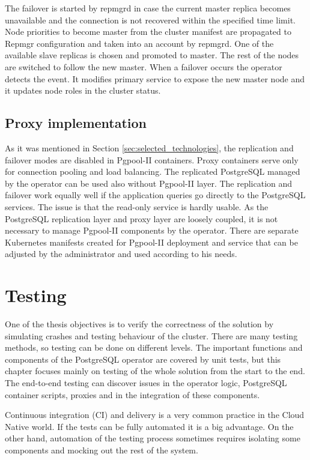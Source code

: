 \documentclass[
  digital, %
  twoside, %
  table,   %
  nolof,   %
  nolot,   %
]{fithesis3}
\begin{document}
The failover is started by repmgrd in case the current master replica becomes unavailable and the connection is not recovered within the specified time limit. Node priorities to become master from the cluster manifest are propagated to Repmgr configuration and taken into an account by repmgrd. One of the available slave replicas is chosen and promoted to master. The rest of the nodes are switched to follow the new master. When a failover occurs the operator detects the event. It modifies primary service to expose the new master node and it updates node roles in the cluster status.

\section{Proxy implementation}
As it was mentioned in Section \ref{sec:selected_technologies}, the replication and failover modes are disabled in Pgpool-II containers. Proxy containers serve only for connection pooling and load balancing. The replicated PostgreSQL managed by the operator can be used also without Pgpool-II layer. The replication and failover work equally well if the application queries go directly to the PostgreSQL services. The issue is that the read-only service is hardly usable. As the PostgreSQL replication layer and proxy layer are loosely coupled, it is not necessary to manage Pgpool-II components by the operator. There are separate Kubernetes manifests created for Pgpool-II deployment and service that can be adjusted by the administrator and used according to his needs.


\chapter{Testing} \label{chap:testing}
One of the thesis objectives is to verify the correctness of the solution by simulating crashes and testing behaviour of the cluster. There are many testing methods, so testing can be done on different levels. The important functions and components of the PostgreSQL operator are covered by unit tests, but this chapter focuses mainly on testing of the whole solution from the start to the end. The end-to-end testing can discover issues in the operator logic, PostgreSQL container scripts, proxies and in the integration of these components.

Continuous integration (CI) and delivery is a very common practice in the Cloud Native world. If the tests can be fully automated it is a big advantage. On the other hand, automation of the testing process sometimes requires isolating some components and mocking out the rest of the system.
\end{document}
